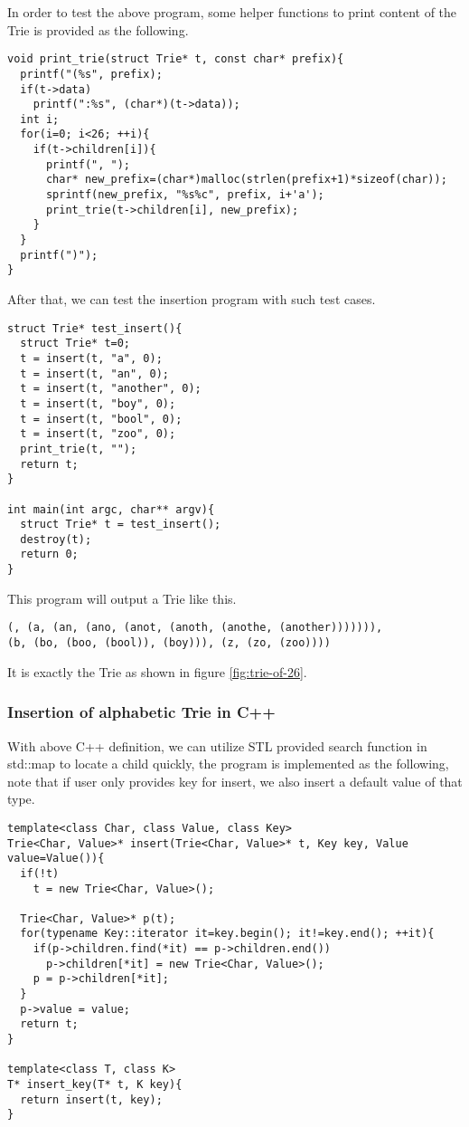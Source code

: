 \documentclass{article}
\begin{document}
In order to test the above program, some helper functions
to print content of the Trie is provided as the following.

\begin{lstlisting}
void print_trie(struct Trie* t, const char* prefix){
  printf("(%s", prefix);
  if(t->data)
    printf(":%s", (char*)(t->data));
  int i;
  for(i=0; i<26; ++i){
    if(t->children[i]){
      printf(", ");
      char* new_prefix=(char*)malloc(strlen(prefix+1)*sizeof(char));
      sprintf(new_prefix, "%s%c", prefix, i+'a');
      print_trie(t->children[i], new_prefix);
    }
  }
  printf(")");
}
\end{lstlisting}

After that, we can test the insertion program with such test
cases.
                                   
\begin{lstlisting}
struct Trie* test_insert(){
  struct Trie* t=0;
  t = insert(t, "a", 0);
  t = insert(t, "an", 0);
  t = insert(t, "another", 0);
  t = insert(t, "boy", 0);
  t = insert(t, "bool", 0);
  t = insert(t, "zoo", 0);
  print_trie(t, "");
  return t;
}

int main(int argc, char** argv){
  struct Trie* t = test_insert();
  destroy(t);
  return 0;
}
\end{lstlisting}

This program will output a Trie like this.

\begin{verbatim}
(, (a, (an, (ano, (anot, (anoth, (anothe, (another))))))), 
(b, (bo, (boo, (bool)), (boy))), (z, (zo, (zoo))))
\end{verbatim}

It is exactly the Trie as shown in figure \ref{fig:trie-of-26}.

\subsubsection*{Insertion of alphabetic Trie in C++}

With above C++ definition, we can utilize STL provided search
function in std::map to locate a child quickly, the program is
implemented as the following, note that if user only provides key for
insert, we also insert a default value of that type.

\lstset{language=C++}
\begin{lstlisting}
template<class Char, class Value, class Key>
Trie<Char, Value>* insert(Trie<Char, Value>* t, Key key, Value value=Value()){
  if(!t)
    t = new Trie<Char, Value>();

  Trie<Char, Value>* p(t);
  for(typename Key::iterator it=key.begin(); it!=key.end(); ++it){
    if(p->children.find(*it) == p->children.end())
      p->children[*it] = new Trie<Char, Value>();
    p = p->children[*it];
  }
  p->value = value;
  return t;
}

template<class T, class K>
T* insert_key(T* t, K key){
  return insert(t, key);
}
\end{lstlisting}
\end{document}
